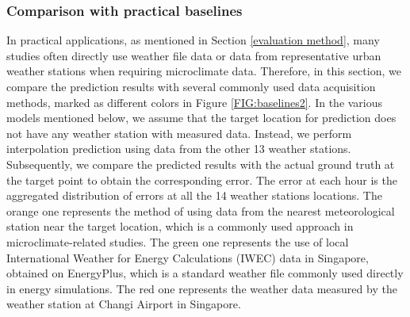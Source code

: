 \documentclass[a4paper,fleqn]{cas-sc}
\begin{document}


\subsubsection{Comparison with practical baselines}\label{level2baseline}

In practical applications, as mentioned in Section \ref{evaluation method}, many studies often directly use weather file data or data from representative urban weather stations when requiring microclimate data. Therefore, in this section, we compare the prediction results with several commonly used data acquisition methods, marked as different colors in Figure \ref{FIG:baselines2}. In the various models mentioned below, we assume that the target location for prediction does not have any weather station with measured data. Instead, we perform interpolation prediction using data from the other 13 weather stations. Subsequently, we compare the predicted results with the actual ground truth at the target point to obtain the corresponding error. The error at each hour is the aggregated distribution of errors at all the 14 weather stations locations. The orange one represents the method of using data from the nearest meteorological station near the target location, which is a commonly used approach in microclimate-related studies. The green one represents the use of local International Weather for Energy Calculations (IWEC) data in Singapore, obtained on EnergyPlus, which is a standard weather file commonly used directly in energy simulations. The red one represents the weather data measured by the weather station at Changi Airport in Singapore.
\end{document}
